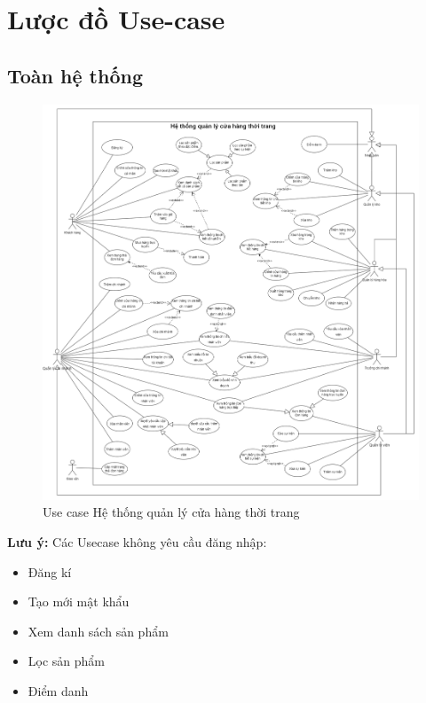 \section{Lược đồ Use-case}
    \subsection{Toàn hệ thống}
        \begin{figure}[!htp]
            \centering    \includegraphics[width=16.5cm]{img/UseCase/UseCase-full.drawio.png}
            \newline
            \caption{Use case Hệ thống quản lý cửa hàng thời trang}
        \end{figure}
    \textbf{Lưu ý:} Các Usecase không yêu cầu đăng nhập:
    \begin{itemize}
        \item Đăng kí
        \item Tạo mới mật khẩu
        \item Xem danh sách sản phẩm
        \item Lọc sản phẩm
        \item Điểm danh
    \end{itemize}

\newpage


